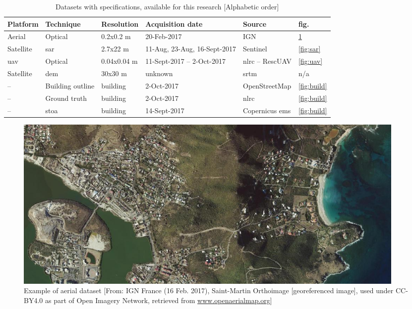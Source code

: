 \begin{table} [h]
	\centering
	\captionsetup{justification=raggedright,singlelinecheck=false}	
	\caption{Datasets with specifications, available for this research [Alphabetic order]}
	\begin{footnotesize}
		\begin{tabular}{lllp{2cm}ll}
			\toprule
			Platform & Technique & Resolution & Acquisition date & Source & fig.\\
			\midrule			
			Aerial & Optical & 0.2x0.2 m & 20-Feb-2017 & IGN  & \ref{fig:ign}  \\
			Satellite & \ac{sar} & 2.7x22 m & 11-Aug, 23-Aug, 16-Sept-2017 & Sentinel & \ref{fig:sar}   \\
			\ac{uav} & Optical & 0.04x0.04 m & 11-Sept-2017 -- 2-Oct-2017  & \ac{nlrc} -- RescUAV  & \ref{fig:uav}  \\
			Satellite & \ac{dem} & 30x30 m & unknown & \ac{srtm} & n/a \\			
			-- & Building outline & building & 2-Oct-2017 & OpenStreetMap & \ref{fig:build}\\
			-- & Ground truth & building & 2-Oct-2017 & \ac{nlrc} & \ref{fig:build}\\
			-- & \ac{stoa} & building & 14-Sept-2017 & Copernicus \ac{ems} & \ref{fig:build}\\
			\bottomrule
		\end{tabular}
	\end{footnotesize}
	\label{tab:data}
\end{table}
\begin{figure}[H]
	\centering
	\captionsetup{justification=raggedright,singlelinecheck=false}
	\includegraphics[width=0.95\textwidth]{figs/ign.png}
	\caption{\footnotesize{Example of aerial dataset [From: IGN France (16 Feb. 2017), Saint-Martin Orthoimage [georeferenced image], used under CC-BY4.0 as part of Open Imagery Network, retrieved from \url{www.openaerialmap.org}]}}
	\label{fig:ign}
\end{figure}

